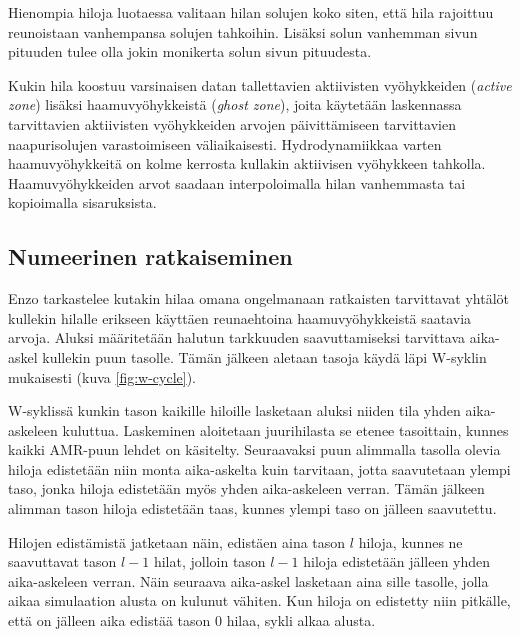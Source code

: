 \documentclass[12pt,a4paper]{article}
\begin{document}
Hienompia hiloja luotaessa valitaan hilan solujen koko siten, että hila rajoittuu reunoistaan vanhempansa solujen tahkoihin. Lisäksi solun vanhemman sivun pituuden tulee olla jokin monikerta solun sivun pituudesta. \cite{enzo}

Kukin hila koostuu varsinaisen datan tallettavien aktiivisten vyöhykkeiden (\textit{active zone}) lisäksi haamuvyöhykkeistä (\textit{ghost zone}), joita käytetään laskennassa tarvittavien aktiivisten vyöhykkeiden arvojen päivittämiseen tarvittavien naapurisolujen varastoimiseen väliaikaisesti. Hydrodynamiikkaa varten haamuvyöhykkeitä on kolme kerrosta kullakin aktiivisen vyöhykkeen tahkolla. Haamuvyöhykkeiden arvot saadaan interpoloimalla hilan vanhemmasta tai kopioimalla sisaruksista.\cite{arxivenzo, enzo}

\subsection{Numeerinen ratkaiseminen} %
Enzo tarkastelee kutakin hilaa omana ongelmanaan ratkaisten tarvittavat yhtälöt kullekin hilalle erikseen käyttäen reunaehtoina haamuvyöhykkeistä saatavia arvoja. Aluksi määritetään halutun tarkkuuden saavuttamiseksi tarvittava aika-askel kullekin puun tasolle. Tämän jälkeen aletaan tasoja käydä läpi W-syklin mukaisesti (kuva \ref{fig:w-cycle}). \cite{enzo} %

W-syklissä kunkin tason kaikille hiloille lasketaan aluksi niiden tila yhden aika-askeleen kuluttua. Laskeminen aloitetaan juurihilasta se etenee tasoittain, kunnes kaikki AMR-puun lehdet on käsitelty. Seuraavaksi puun alimmalla tasolla olevia hiloja edistetään niin monta aika-askelta kuin tarvitaan, jotta saavutetaan ylempi taso, jonka hiloja edistetään myös yhden aika-askeleen verran. Tämän jälkeen alimman tason hiloja edistetään taas, kunnes ylempi taso on jälleen saavutettu. \cite{enzo}

Hilojen edistämistä jatketaan näin, edistäen aina tason $l$ hiloja, kunnes ne saavuttavat tason $l-1$ hilat, jolloin tason $l-1$ hiloja edistetään jälleen yhden aika-askeleen verran. Näin seuraava aika-askel lasketaan aina sille tasolle, jolla aikaa simulaation alusta on kulunut vähiten. Kun hiloja on edistetty niin pitkälle, että on jälleen aika edistää tason 0 hilaa, sykli alkaa alusta. \cite{enzo}
\end{document}
